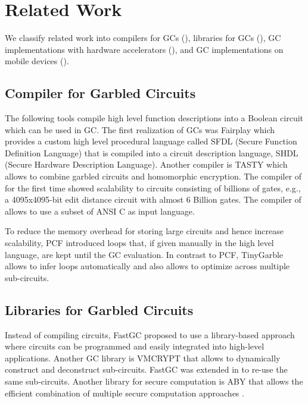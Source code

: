 \chapter{Related Work}
We classify related work into compilers for GCs (), libraries for GCs (), GC implementations with hardware accelerators (), and GC implementations on mobile devices ().

\section{Compiler for Garbled Circuits}
The following tools compile high level function descriptions into a Boolean circuit which can be used in GC.
The first realization of GCs was Fairplay \cite{malkhi2004fairplay} which provides a custom high level procedural language called SFDL (Secure Function Definition Language) that is compiled into a circuit description language, SHDL (Secure Hardware Description Language).
Another compiler is TASTY \cite{henecka2010tasty} which allows to combine garbled circuits and homomorphic encryption.
The compiler of \cite{kreuter2012billion} for the first time showed scalability to circuits consisting of billions of gates, e.g., a 4095x4095-bit edit distance circuit with almost 6 Billion gates.
The compiler of \cite{franz2014cbmc} allows to use a subset of ANSI C as input language.

To reduce the memory overhead for storing large circuits and hence increase scalability, PCF \cite{kreuter2013pcf} introduced loops that, if given manually in the high level language, are kept until the GC evaluation.
In contrast to PCF, TinyGarble allows to infer loops automatically and also allows to optimize across multiple sub-circuits.

\section{Libraries for Garbled Circuits}
Instead of compiling circuits, FastGC \cite{huang2011faster} proposed to use a library-based approach where circuits can be programmed and easily integrated into high-level applications.
Another GC library is VMCRYPT \cite{malka2011vmcrypt} that allows to dynamically construct and deconstruct sub-circuits.
FastGC was extended in \cite{henecka2013faster} to re-use the same sub-circuits.
Another library for secure computation is ABY that allows the efficient combination of multiple secure computation approaches \cite{demmler2015aby}.

